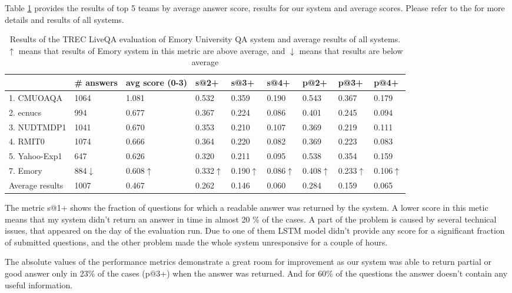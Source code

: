 Table \ref{table:liveqa-results} provides the results of top 5 teams by average answer score, results for our system and average scores.
Please refer to the \cite{overviewliveqa15} for more details and results of all systems.

\begin{table}
	\centering
	\begin{tabular}{|p{3cm}|p{2cm}|p{1.3cm}|p{1.3cm}|p{1.3cm}|p{1.3cm}|p{1cm}|p{1cm}|p{1cm}|}
		\hline
		& \# answers & avg score (0-3) & s@2+ & s@3+ & s@4+ & p@2+ &  p@3+ & p@4+ \\
		\hline
		1. CMUOAQA & 1064 & 1.081 & 0.532 & 0.359 & 0.190 & 0.543 & 0.367 & 0.179 \\
		2. ecnucs & 994 & 0.677 & 0.367 & 0.224 & 0.086 & 0.401 & 0.245 & 0.094\\
		3. NUDTMDP1 & 1041 & 0.670 & 0.353 & 0.210 & 0.107 & 0.369 & 0.219 & 0.111\\
		4. RMIT0 & 1074 & 0.666 & 0.364 & 0.220 & 0.082 & 0.369 & 0.223 & 0.083\\
		5. Yahoo-Exp1 & 647 & 0.626 & 0.320 & 0.211 & 0.095 & 0.538 & 0.354 & 0.159\\
		\hline
		7. Emory & 884$\downarrow$ & 0.608$\uparrow$ & 0.332$\uparrow$ & 0.190$\uparrow$ & 0.086$\uparrow$ & 0.408$\uparrow$ & 0.233$\uparrow$ & 0.106$\uparrow$\\
		\hline
		Average results & 1007 & 0.467 & 0.262 & 0.146 & 0.060 & 0.284 & 0.159 & 0.065\\
		\hline
	\end{tabular}
\caption{Results of the TREC LiveQA evaluation of Emory University QA system and average results of all systems. $\uparrow$ means that results of Emory system in this metric are above average, and $\downarrow$ means that results are below average}
\label{table:liveqa-results}
\end{table}

The metric s@1+ shows the fraction of questions for which a readable answer was returned by the system.
A lower score in this metic means that my system didn't return an answer in time in almost 20 \% of the cases.
A part of the problem is caused by several technical issues, that appeared on the day of the evaluation run.
Due to one of them LSTM model didn't provide any score for a significant fraction of submitted questions, and the other problem made the whole system unresponsive for a couple of hours.

The absolute values of the performance metrics demonstrate a great room for improvement as our system was able to return partial or good answer only in 23\% of the cases (p@3+) when the answer was returned.
And for 60\% of the questions the answer doesn't contain any useful information.

